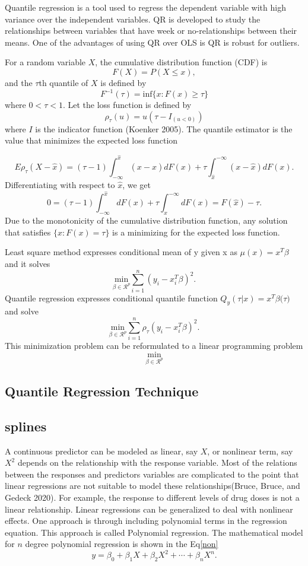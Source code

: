 \documentclass[
  12pt,
]{article}
\begin{document}
Quantile regression is a tool used to regress the dependent variable with high variance over the independent variables. QR is developed to study the relationships between variables that have week or no-relationships between their means. One of the advantages of using QR over OLS is QR is robust for outliers.

For a random variable \(X\), the cumulative distribution function (CDF) is \[F(X)=P(X\leq x),\] and the \(\tau\)th quantile of \(X\) is defined by \[ F^{-1}(\tau)=\text{inf}\{x: F(x)\ge \tau\} \] where \(0<\tau<1\).
Let the loss function is defined by \[\rho_{\tau}(u)= u(\tau-I_{(u<0)})\] where \(I\) is the indicator function (Koenker 2005). The quantile estimator is the value that minimizes the expected loss function

\[E\rho_{\tau}(X-\hat{x})=(\tau-1)\int_{-\infty}^{\hat{x}} (x-\hat{x})dF(x)+\tau\int_{\hat{x}}^{-\infty} (x-\hat{x})dF(x).\]
Differentiating with respect to \(\hat{x}\), we get
\[ 0  =(\tau-1)\int_{-\infty}^{\hat{x}} dF(x)+\tau\int_{\hat{x}}^{-\infty} dF(x)
=F(\hat{x})-\tau.\]
Due to the monotonicity of the cumulative distribution function, any solution that satisfies \(\{x:F(x)=\tau \}\) is a minimizing for the expected loss function.

Least square method expresses conditional mean of y given x as \(\mu(x)=x^T\beta\) and it solves \[ \underset{\beta\in \mathcal{R}^p}{\text{min}}\sum_{i=1}^n(y_i- x_i^T\beta)^2.\] Quantile regression expresses conditional quantile function \(Q_y(\tau|x)=x^T \beta ({\tau)}\) and solve \[ \underset{\beta\in \mathcal{R}^p}{\text{min}}\sum_{i=1}^n\rho_{\tau}(y_i- x_i^T\beta)^2.\]This minimization problem can be reformulated to a linear programming problem \[ \underset{\beta\in \mathcal{R}^p}{\text{min}} \]

\subsection{Quantile Regression Technique }

\subsection{splines}

A continuous predictor can be modeled as linear, say \(X\), or nonlinear term, say \(X^2\) depends on the relationship with the response variable. Most of the relations between the responses and predictors variables are complicated to the point that linear regressions are not suitable to model these relationships(Bruce, Bruce, and Gedeck 2020). For example, the response to different levels of drug doses is not a linear relationship. Linear regressions can be generalized to deal with nonlinear effects. One approach is through including polynomial terms in the regression equation. This approach is called Polynomial regression. The mathematical model for \(n\) degree polynomial regression is shown in the Eq\eqref{non}
\begin{equation}\label{non}
 y=\beta_0+\beta_1 X+\beta_2 X^2+\cdots+\beta_nX^n.
 \end{equation}
\end{document}
